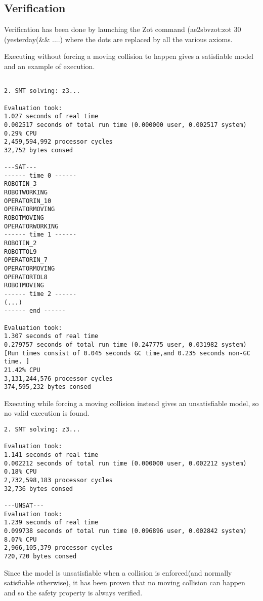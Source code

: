 \subsection{Verification}
Verification has been done by launching the Zot command	(ae2sbvzot:zot 30 (yesterday(\&\& ....) where the dots are replaced by all the various axioms.


\vspace{10mm}

Executing without forcing a moving collision to happen gives a satisfiable model and an example of execution.
\begin{verbatim}

2. SMT solving: z3...

Evaluation took:
1.027 seconds of real time
0.002517 seconds of total run time (0.000000 user, 0.002517 system)
0.29% CPU
2,459,594,992 processor cycles
32,752 bytes consed

---SAT---
------ time 0 ------
ROBOTIN_3
ROBOTWORKING
OPERATORIN_10
OPERATORMOVING
ROBOTMOVING
OPERATORWORKING
------ time 1 ------
ROBOTIN_2
ROBOTTOL9
OPERATORIN_7
OPERATORMOVING
OPERATORTOL8
ROBOTMOVING
------ time 2 ------
(...)
------ end ------

Evaluation took:
1.307 seconds of real time
0.279757 seconds of total run time (0.247775 user, 0.031982 system) 
[Run times consist of 0.045 seconds GC time,and 0.235 seconds non-GC time. ]
21.42% CPU
3,131,244,576 processor cycles
374,595,232 bytes consed
\end{verbatim}


\vspace{10mm}

Executing while forcing a moving collision instead gives an unsatisfiable model, so no valid execution is found.

\begin{verbatim}
2. SMT solving: z3...

Evaluation took:
1.141 seconds of real time
0.002212 seconds of total run time (0.000000 user, 0.002212 system)
0.18% CPU
2,732,598,183 processor cycles
32,736 bytes consed

---UNSAT---
Evaluation took:
1.239 seconds of real time
0.099738 seconds of total run time (0.096896 user, 0.002842 system)
8.07% CPU
2,966,105,379 processor cycles
720,720 bytes consed

\end{verbatim}



Since the model is unsatisfiable when a collision is enforced(and normally satisfiable otherwise), it has been proven that no moving collision can happen and so the safety property is always verified.
